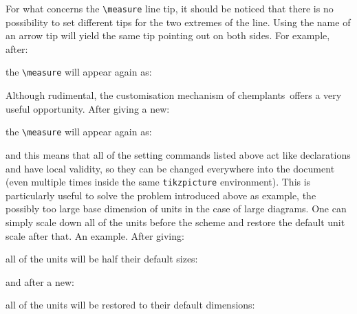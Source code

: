 \documentclass[12pt]{article}						%
\newcommand*{\chemplants}{chemplants}
\begin{document}
For what concerns the \verb|\measure| line tip, it should be noticed that there
is no possibility to set different tips for the two extremes of the line.
Using the name of an arrow tip will yield the same tip pointing out on both
sides. For example, after:
\begin{chpcode}
\end{chpcode}
the \verb|\measure| will appear again as:
\begin{center}
\end{center}

Although rudimental, the customisation mechanism of \chemplants\ offers a very
useful opportunity. After giving a new:
\begin{chpcode}
	\setchpmeasuretip{|}
\end{chpcode}
\setchpmeasuretip{|}
the \verb|\measure| will appear again as:
\begin{center}
\end{center}
and this means that all of the setting commands listed above act like
declarations and have local validity, so they can be changed everywhere into the
document (even multiple times inside the same \verb|tikzpicture| environment).
This is particularly useful to solve the problem introduced above as example,
the possibly too large base dimension of units in the case of large diagrams. One
can simply scale down all of the units before the scheme and restore the default
unit scale after that. An example. After giving:
\begin{chpcode}
\end{chpcode}
all of the units will be half their default sizes:
\begin{center}
\end{center}
and after a new:
\begin{chpcode}
\end{chpcode}
all of the units will be restored to their default dimensions:
\begin{center}
\end{center}
\end{document}
